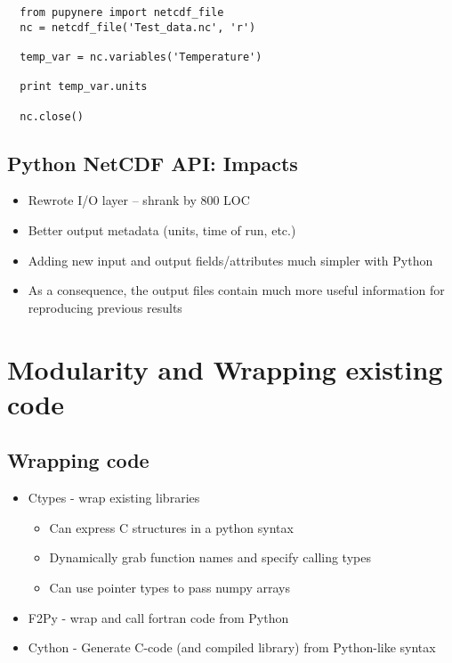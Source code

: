 \documentclass[twocolumn]{article}
\begin{document}
  \lstset{language=Python}
  \begin{lstlisting}
  from pupynere import netcdf_file
  nc = netcdf_file('Test_data.nc', 'r')

  temp_var = nc.variables('Temperature')

  print temp_var.units

  nc.close()
  \end{lstlisting}

\subsection{Python NetCDF API: Impacts}
  \begin{itemize}
    \item Rewrote I/O layer -- shrank by 800 LOC
    \item Better output metadata (units, time of run, etc.)
    \item Adding new input and output fields/attributes much simpler with Python
    \item As a consequence, the output files contain much more useful
      information for reproducing previous results
  \end{itemize}

\section{Modularity and Wrapping existing code}
\subsection{Wrapping code}
  \begin{itemize}
    \item Ctypes - wrap existing libraries
    \begin{itemize}
        \item Can express C structures in a python syntax
        \item Dynamically grab function names and specify calling types
        \item Can use pointer types to pass numpy arrays
    \end{itemize}
    \item F2Py - wrap and call fortran code from Python
    \item Cython - Generate C-code (and compiled library) from Python-like syntax
  \end{itemize}
\end{document}

